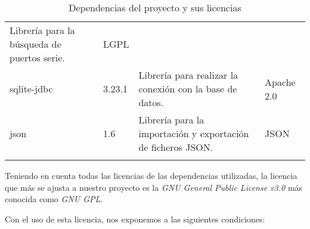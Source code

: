 \begin{longtable}[]{@{}llll@{}}
\begin{minipage}[t]{0.49\columnwidth}
Librería para la búsqueda de puertos serie.\strut
\end{minipage} & \begin{minipage}[t]{0.11\columnwidth}\raggedright\strut
LGPL\strut
\end{minipage}\tabularnewline
\begin{minipage}[t]{0.18\columnwidth}\raggedright\strut
sqlite-jdbc\strut
\end{minipage} & \begin{minipage}[t]{0.08\columnwidth}\raggedright\strut
3.23.1\strut
\end{minipage} & \begin{minipage}[t]{0.49\columnwidth}\raggedright\strut
Librería para realizar la conexión con la base de datos.\strut
\end{minipage} & \begin{minipage}[t]{0.11\columnwidth}\raggedright\strut
Apache 2.0\strut
\end{minipage}\tabularnewline
\begin{minipage}[t]{0.18\columnwidth}\raggedright\strut
json\strut
\end{minipage} & \begin{minipage}[t]{0.08\columnwidth}\raggedright\strut
1.6\strut
\end{minipage} & \begin{minipage}[t]{0.49\columnwidth}\raggedright\strut
Librería para la importación y exportación de ficheros JSON.\strut
\end{minipage} & \begin{minipage}[t]{0.11\columnwidth}\raggedright\strut
JSON\strut
\end{minipage}\tabularnewline
\bottomrule
\caption{Dependencias del proyecto y sus licencias}
\end{longtable}


Teniendo en cuenta todas las licencias de las dependencias utilizadas, la licencia que más se ajusta a nuestro proyecto es la \emph{GNU General Public License v3.0} más conocida como \emph{GNU GPL}.

Con el uso de esta licencia, nos exponemos a las siguientes condiciones:


